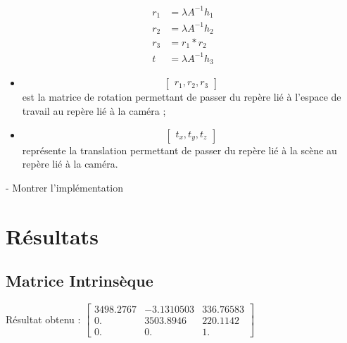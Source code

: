 \documentclass[a4paper]{article}
\begin{document}
\begin{equation}
  \begin{aligned}
    r_1 &= \lambda A^{-1} h_1 \\
    r_2 &= \lambda A^{-1} h_2 \\
    r_3 &= r_1 * r_2 \\
    t &= \lambda A^{-1} h_3
  \end{aligned}
\end{equation}

\begin{itemize}
\item
\begin{equation}
  \begin{bmatrix}
    r_1, r_2, r_3
  \end{bmatrix}
\end{equation}
est la matrice de rotation permettant de passer du repère lié à l'espace de travail au repère lié à la caméra ;

\item
\begin{equation}
  \begin{bmatrix}
    t_x, t_y, t_z
  \end{bmatrix}
\end{equation}
 représente la translation permettant de passer du repère lié à la scène au repère lié à la caméra.
\end{itemize}

- Montrer l'implémentation

\clearpage

\section{Résultats}

\subsection{Matrice Intrinsèque}

Résultat obtenu :
  $\begin{bmatrix}
      3498.2767 & - 3.1310503  &  336.76583 \\
      0.        &   3503.8946  &  220.1142 \\
      0.        &   0.         &  1.
  \end{bmatrix}$
\end{document}
